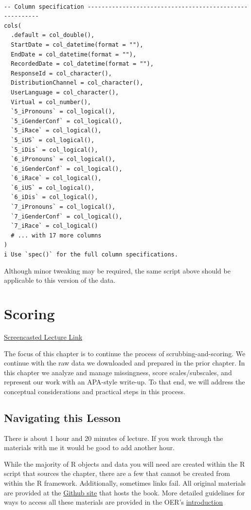 \documentclass[
  11pt,
]{book}
\begin{document}
\begin{verbatim}

-- Column specification --------------------------------------------------------
cols(
  .default = col_double(),
  StartDate = col_datetime(format = ""),
  EndDate = col_datetime(format = ""),
  RecordedDate = col_datetime(format = ""),
  ResponseId = col_character(),
  DistributionChannel = col_character(),
  UserLanguage = col_character(),
  Virtual = col_number(),
  `5_iPronouns` = col_logical(),
  `5_iGenderConf` = col_logical(),
  `5_iRace` = col_logical(),
  `5_iUS` = col_logical(),
  `5_iDis` = col_logical(),
  `6_iPronouns` = col_logical(),
  `6_iGenderConf` = col_logical(),
  `6_iRace` = col_logical(),
  `6_iUS` = col_logical(),
  `6_iDis` = col_logical(),
  `7_iPronouns` = col_logical(),
  `7_iGenderConf` = col_logical(),
  `7_iRace` = col_logical()
  # ... with 17 more columns
)
i Use `spec()` for the full column specifications.
\end{verbatim}

Although minor tweaking may be required, the same script above should be applicable to this version of the data.

\hypertarget{score}{%
\chapter{Scoring}\label{score}}

\href{https://youtube.com/playlist?list=PLtz5cFLQl4KNJXbHg2vDU-sbCH-QwXMlr\&si=7i1LFdRqxEJMLVZ6}{Screencasted Lecture Link}

The focus of this chapter is to continue the process of scrubbing-and-scoring. We continue with the raw data we downloaded and prepared in the prior chapter. In this chapter we analyze and manage missingness, score scales/subscales, and represent our work with an APA-style write-up. To that end, we will address the conceptual considerations and practical steps in this process.

\hypertarget{navigating-this-lesson-1}{%
\section{Navigating this Lesson}\label{navigating-this-lesson-1}}

There is about 1 hour and 20 minutes of lecture. If you work through the materials with me it would be good to add another hour.

While the majority of R objects and data you will need are created within the R script that sources the chapter, there are a few that cannot be created from within the R framework. Additionally, sometimes links fail. All original materials are provided at the \href{https://github.com/lhbikos/ReC_MultivModel}{Github site} that hosts the book. More detailed guidelines for ways to access all these materials are provided in the OER's \protect\hyperlink{ReCintro}{introduction}
\end{document}
